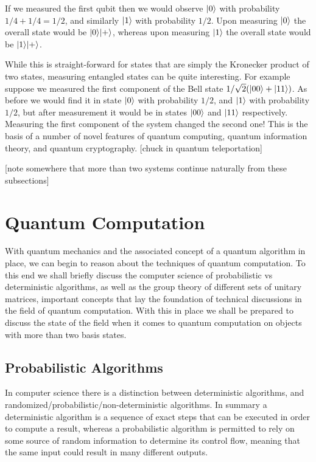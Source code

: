 If we measured the first qubit then we would observe $| 0 \rangle$ with probability $1/4+1/4 = 1/2$, and similarly $| 1 \rangle$ with probability $1/2$. Upon measuring $| 0 \rangle$ the overall state would be $| 0 \rangle| + \rangle$, whereas upon measuring $| 1 \rangle$ the overall state would be $| 1 \rangle| + \rangle$.

While this is straight-forward for states that are simply the Kronecker product of two states, measuring entangled states can be quite interesting. For example suppose we measured the first component of the Bell state $1/\sqrt{2}(| 00 \rangle+| 11 \rangle)$. As before we would find it in state $| 0 \rangle$ with probability $1/2$, and $| 1 \rangle$ with probability $1/2$, but after measurement it would be in states $| 00 \rangle$ and $| 11 \rangle$ respectively. Measuring the first component of the system changed the second one! This is the basis of a number of novel features of quantum computing, quantum information theory, and quantum cryptography. [chuck in quantum teleportation]

[note somewhere that more than two systems continue naturally from these subsections]

\section{Quantum Computation}

With quantum mechanics and the associated concept of a quantum algorithm in place, we can begin to reason about the techniques of quantum computation. To this end we shall briefly discuss the computer science of probabilistic vs deterministic algorithms, as well as the group theory of different sets of unitary matrices, important concepts that lay the foundation of technical discussions in the field of quantum computation. With this in place we shall be prepared to discuss the state of the field when it comes to quantum computation on objects with more than two basis states.

\subsection{Probabilistic Algorithms}
In computer science there is a distinction between deterministic algorithms, and randomized/probabilistic/non-deterministic algorithms. In summary a deterministic algorithm is a sequence of exact steps that can be executed in order to compute a result, whereas a probabilistic algorithm is permitted to rely on some source of random information to determine its control flow, meaning that the same input could result in many different outputs.

